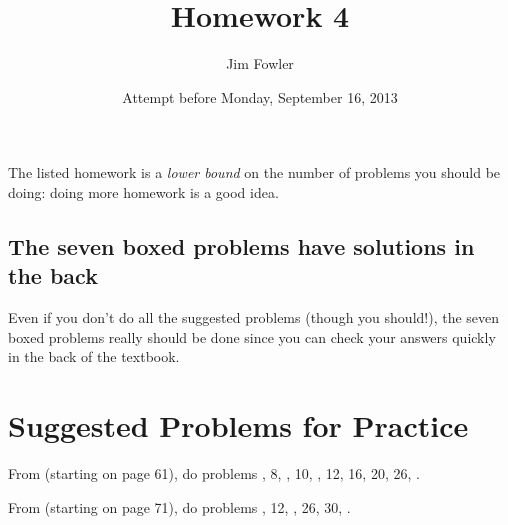 \documentclass[12pt]{handout}
\title{Homework 4}
\date{Attempt before Monday, September 16, 2013}
\author{Jim Fowler}
\begin{document}
\maketitle




The listed homework is a \textit{lower bound} on the number of
problems you should be doing: doing more homework is a good idea.






\subsection*{The seven boxed problems have solutions in the back}
Even if you don't do all the suggested problems (though you should!), the seven boxed problems really should be done since you can check your answers quickly in the back of the textbook.

\section*{Suggested Problems for Practice}

From  (starting on page 61),
do problems , 8, , 10, , 12, 16, 20, 26, .
\vspace{1ex}

From  (starting on page 71),
do problems , 12, , 26, 30, .
\vspace{1ex}
\end{document}
